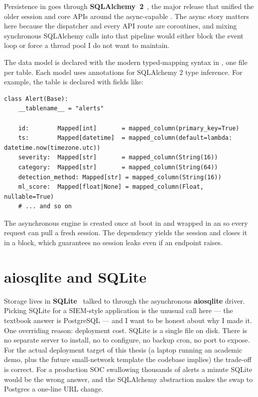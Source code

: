Persistence in \nidsname{} goes through
\textbf{SQLAlchemy~2}~\cite{sqlalchemy}, the major release that
unified the older session and core APIs around the
async-capable . The async story matters here
because the dispatcher and every API route are coroutines, and
mixing synchronous SQLAlchemy calls into that pipeline would
either block the event loop or force a thread pool I do not
want to maintain.

The data model is declared with the modern typed-mapping syntax in
, one file per table. Each model uses
 annotations for SQLAlchemy 2 type inference. For
example, the  table is declared with fields like:

\begin{lstlisting}[style=pyfile,caption={Excerpt from backend/app/models/alert.py},label={lst:tech-alert-model}]
class Alert(Base):
    __tablename__ = "alerts"

    id:        Mapped[int]       = mapped_column(primary_key=True)
    ts:        Mapped[datetime]  = mapped_column(default=lambda: datetime.now(timezone.utc))
    severity:  Mapped[str]       = mapped_column(String(16))
    category:  Mapped[str]       = mapped_column(String(64))
    detection_method: Mapped[str] = mapped_column(String(16))
    ml_score:  Mapped[float|None] = mapped_column(Float, nullable=True)
    # ... and so on
\end{lstlisting}

The asynchronous engine is created once at boot in
 and wrapped in an
 so every request can pull a fresh session.
The  dependency yields the session and closes it in a
 block, which guarantees no session leaks even if an
endpoint raises.

\section{aiosqlite and SQLite}
\label{sec:tech-sqlite}

Storage lives in \textbf{SQLite}~\cite{sqlite} talked to through
the asynchronous \textbf{aiosqlite} driver. Picking SQLite for a
SIEM-style application is the unusual call here --- the textbook
answer is PostgreSQL --- and I want to be honest about why I
made it. One overriding reason: deployment cost. SQLite is a
single file on disk. There is no separate server to install, no
 to configure, no backup cron, no port to
expose. For the actual deployment target of this thesis (a
laptop running an academic demo, plus the future small-network
template the codebase implies) the trade-off is correct. For a
production SOC swallowing thousands of alerts a minute SQLite
would be the wrong answer, and the SQLAlchemy abstraction makes
the swap to Postgres a one-line URL change.


